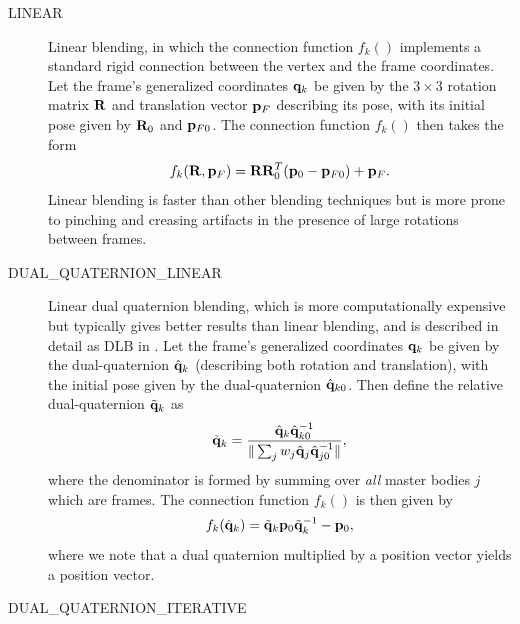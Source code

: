 \begin{description}

\item[LINEAR]\mbox{}

Linear blending, in which the connection function $f_k()$ implements a
standard rigid connection between the vertex and the frame
coordinates. Let the frame's generalized coordinates ${\bf q}_k$ be given
by the $3 \times 3$ rotation matrix ${\bf R}$ and translation vector ${\bf p}_F$
describing its pose, with its initial pose given by ${\bf R}_{0}$ and
${\bf p}_{F0}$. The connection function $f_k()$ then takes the form
%
\begin{equation}
f_k ({\bf R}, {\bf p}_F) = {\bf R} {\bf R}_0^T ( {\bf p}_0 - {\bf p}_{F0}) + {\bf p}_F.
\end{equation}
%
Linear blending is faster than other blending techniques but is more
prone to pinching and creasing artifacts in the presence of large
rotations between frames.

\item[DUAL\_QUATERNION\_LINEAR]\mbox{}

Linear dual quaternion blending, which is more computationally
expensive but typically gives better results than linear blending, and
is described in detail as DLB in \cite{kavan2008geometric}. Let the
frame's generalized coordinates ${\bf q}_k$ be given by the dual-quaternion
$\hat{{\bf q}}_k$ (describing both rotation and translation), with the
initial pose given by the dual-quaternion $\hat{{\bf q}}_{k0}$.  Then define
the relative dual-quaternion $\tilde{{\bf q}}_k$ as
%
\begin{equation}
\tilde{{\bf q}}_k = 
\frac{\hat{{\bf q}}_k \hat{{\bf q}}_{k0}^{-1}}{\| \sum_j w_j \hat{{\bf q}}_j \hat{{\bf q}}_{j0}^{-1} \|},
\end{equation}
%
where the denominator is formed by summing over {\it all} master
bodies $j$ which are frames.  The connection function $f_k()$ is then
given by
%
\begin{equation}
f_k (\hat{{\bf q}}_k) = \tilde{{\bf q}}_k {\bf p}_0 \tilde{{\bf q}}_k^{-1} - {\bf p}_0,
\end{equation}
%
where we note that a dual quaternion multiplied by a position vector
yields a position vector.

\item[DUAL\_QUATERNION\_ITERATIVE]\mbox{}


\end{description}
